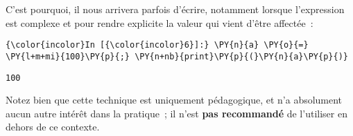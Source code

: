     C'est pourquoi, il nous arrivera parfois d'écrire, notamment lorsque
l'expression est complexe et pour rendre explicite la valeur qui vient
d'être affectée~:

    \begin{Verbatim}[commandchars=\\\{\},frame=single,framerule=0.3mm,rulecolor=\color{cellframecolor}]
{\color{incolor}In [{\color{incolor}6}]:} \PY{n}{a} \PY{o}{=} \PY{l+m+mi}{100}\PY{p}{;} \PY{n+nb}{print}\PY{p}{(}\PY{n}{a}\PY{p}{)}
\end{Verbatim}


    \begin{Verbatim}[commandchars=\\\{\},frame=single,framerule=0.3mm,rulecolor=\color{cellframecolor}]
100
\end{Verbatim}

    Notez bien que cette technique est uniquement pédagogique, et n'a
absolument aucun autre intérêt dans la pratique~; il n'est \textbf{pas
recommandé} de l'utiliser en dehors de ce contexte.


    
    
    
